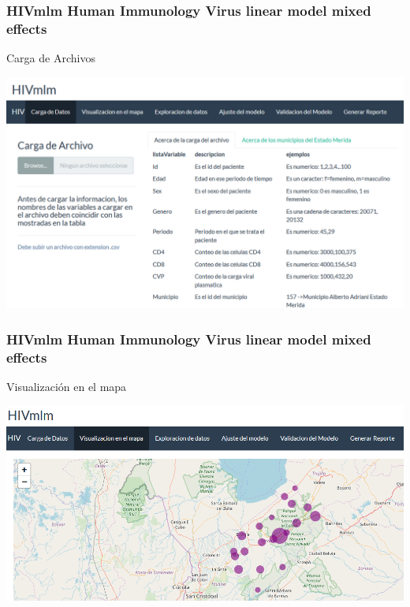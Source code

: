 \documentclass{beamer}%
\begin{document}
\begin{frame}
\frametitle{\textbf{HIVmlm Human Immunology Virus linear model mixed effects}}
 
  	Carga de Archivos
  	 \begin{center}\includegraphics[height=0.6\textheight]{HIVmlm.PNG}\end{center}
  
\end{frame}

\begin{frame}
\frametitle{\textbf{HIVmlm Human Immunology Virus linear model mixed effects}}
 
  	Visualizaci\'on en el mapa
  	 \begin{center}\includegraphics[height=0.6\textheight]{mapa.PNG}\end{center}
  
\end{frame}
\end{document}
